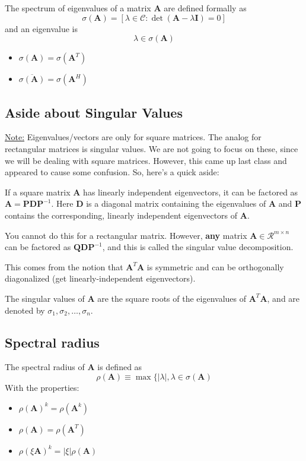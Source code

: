 \documentclass[12pt]{article}
\newcommand{\ve}[1]{\ensuremath{\mathbf{#1}}}
\newcommand{\cc}[1]{\ensuremath{\overline{#1}}}
\begin{document}
The spectrum of eigenvalues of a matrix $\ve{A}$ are defined formally as
\[\sigma(\ve{A}) = [ \lambda \in \mathcal{C} : \det(\ve{A} - \lambda \ve{I})=0] \] 
and an eigenvalue is 
\[ \lambda \in \sigma(\ve{A}) \]
%
\begin{itemize}
\item $\sigma(\ve{A}) = \sigma(\ve{A}^T)$
\item $\cc{\sigma(\ve{A})} = \sigma(\ve{A}^H)$
\end{itemize}

\subsection{Aside about Singular Values}

\underline{Note:} Eigenvalues/vectors are only for square matrices. The analog for rectangular matrices is singular values. We are not going to focus on these, since we will be dealing with square matrices. However, this came up last class and appeared to cause some confusion. So, here's a quick aside:

If a square matrix $\ve{A}$ has linearly independent eigenvectors, it can be factored as $\ve{A} = \ve{P}\ve{D}\ve{P}^{-1}$. Here $\ve{D}$ is a diagonal matrix containing the eigenvalues of $\ve{A}$ and $\ve{P}$ contains the corresponding, linearly independent eigenvectors of $\ve{A}$.  

You cannot do this for a rectangular matrix. However, \textbf{any} matrix $\ve{A} \in \mathcal{R}^{m \times n}$ can be factored as $\ve{Q}\ve{D}\ve{P}^{-1}$, and this is called the singular value decomposition. 

This comes from the notion that $\ve{A}^T\ve{A}$ is symmetric and can be orthogonally diagonalized (get linearly-independent eigenvectors). 

The singular values of $\ve{A}$ are the square roots of the eigenvalues of $\ve{A}^T\ve{A}$, and are denoted by $\sigma_1, \sigma_2, \dots, \sigma_n$. 

\subsection{Spectral radius} 

The spectral radius of $\ve{A}$ is defined as 
\[\rho(\ve{A}) \equiv \max \lbrace |\lambda|, \lambda \in \sigma(\ve{A})\]
With the properties:
%
\begin{itemize}
\item $\rho(\ve{A})^k = \rho(\ve{A}^k)$
\item $\rho(\ve{A}) = \rho(\ve{A}^T)$
\item $\rho(\xi \ve{A})^k = |\xi| \rho(\ve{A})$
\end{itemize}
\end{document}
